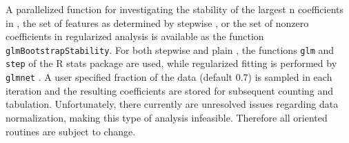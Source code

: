 A parallelized function for investigating the stability of the largest n coefficients in , the set of features as determined by stepwise , or the set of nonzero coefficients in regularized  analysis is available as the function \texttt{glmBootstrapStability}. For both stepwise and plain , the functions \texttt{glm} and \texttt{step} of the R stats package are used, while regularized fitting is performed by \texttt{glmnet} \citep{Friedman2010}. A user specified fraction of the data (default 0.7) is sampled in each iteration and the resulting coefficients are stored for subsequent counting and tabulation. Unfortunately, there currently are unresolved issues regarding data normalization, making this type of analysis infeasible. Therefore all  oriented routines are subject to change.

